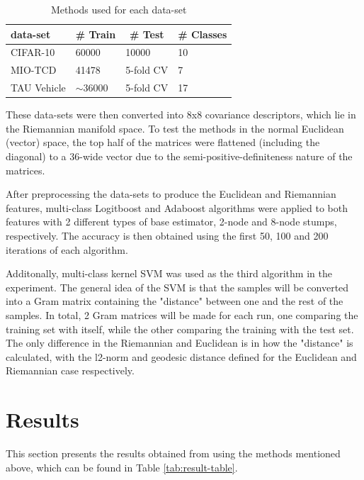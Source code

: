 \documentclass[12pt]{article}
\begin{document}
\begin{sloppypar}
\begin{table}[hbt!]
\centering
\caption{Methods used for each data-set}
\label{tab:method-table}
\begin{tabular}{llll}
\hline
\textbf{data-set}    & \multicolumn{1}{c}{\textbf{\# Train}} & \multicolumn{1}{c}{\textbf{\# Test}} & \multicolumn{1}{c}{\textbf{\# Classes}} \\ \hline
CIFAR-10            & 60000                                 & 10000                                & 10                                      \\
MIO-TCD             & 41478                                 & 5-fold CV                            & 7                                       \\
TAU Vehicle         & $\sim$36000                           & 5-fold CV                            & 17                                      \\
\end{tabular}
\end{table}
\vspace{5mm}
\noindent
These data-sets were then converted into 8x8 covariance descriptors, which lie in the Riemannian manifold space. To test the methods in the normal Euclidean (vector) space, the top half of the matrices were flattened (including the diagonal) to a 36-wide vector due to the semi-positive-definiteness nature of the matrices.

After preprocessing the data-sets to produce the Euclidean and Riemannian features, multi-class Logitboost and Adaboost algorithms were applied to both features with 2 different types of base estimator, 2-node and 8-node stumps, respectively. The accuracy is then obtained using the first 50, 100 and 200 iterations of each algorithm. 

Additonally, multi-class kernel SVM was used as the third algorithm in the experiment. The general idea of the SVM is that the samples will be converted into a Gram matrix containing the "distance" between one and the rest of the samples. In total, 2 Gram matrices will be made for each run, one comparing the training set with itself, while the other comparing the training with the test set. The only difference in the Riemannian and Euclidean is in how the "distance" is calculated, with the l2-norm and geodesic distance defined for the Euclidean and Riemannian case respectively.

\section{Results}
This section presents the results obtained from using the methods mentioned above, which can be found in Table \ref{tab:result-table}.


\end{sloppypar}
\end{document}
